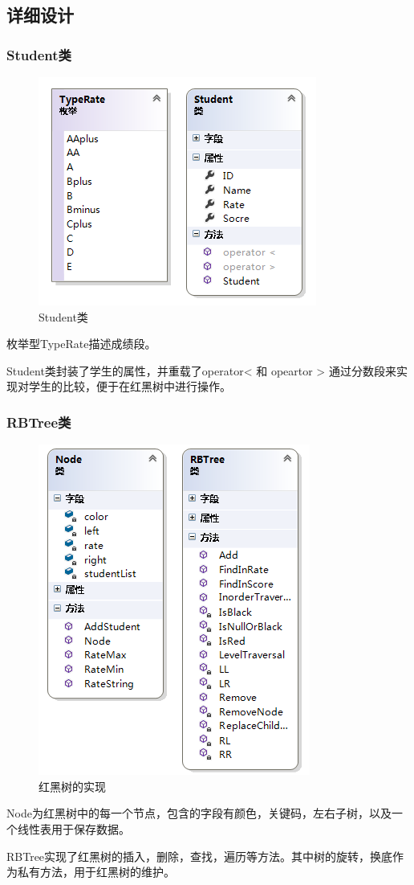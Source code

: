 \documentclass[12pt,a4paper]{article}
\begin{document}
\subsection{详细设计}
\subsubsection{Student类}
\begin{figure}[H]
\centering
\includegraphics[scale = 1]{3.png}
\caption{Student类} 
\end{figure}
枚举型TypeRate描述成绩段。\par
Student类封装了学生的属性，并重载了operator< 和 opeartor > 通过分数段来实现对学生的比较，便于在红黑树中进行操作。
\subsubsection{RBTree类}
\begin{figure}[H]
\centering
\includegraphics[scale = 1]{4.png}
\caption{红黑树的实现} 
\end{figure}
Node为红黑树中的每一个节点，包含的字段有颜色，关键码，左右子树，以及一个线性表用于保存数据。\par
RBTree实现了红黑树的插入，删除，查找，遍历等方法。其中树的旋转，换底作为私有方法，用于红黑树的维护。
\end{document}
